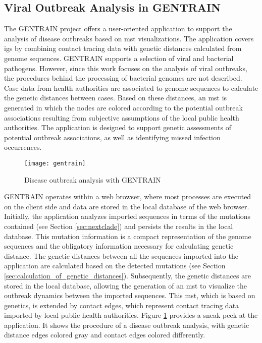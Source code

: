 \subsection{Viral Outbreak Analysis in GENTRAIN}
The GENTRAIN project offers a user-oriented application to support the analysis of disease outbreaks based on \acrshort{mst} visualizations. The application covers \acrshort{igs} by combining contact tracing data with genetic distances calculated from genome sequences. GENTRAIN supports a selection of viral and bacterial pathogens. However, since this work focuses on the analysis of viral outbreaks, the procedures behind the processing of bacterial genomes are not described.
Case data from health authorities are associated to genome sequences to calculate the genetic distances between cases. Based on these distances, an \acrshort{mst} is generated in which the nodes are colored according to the potential outbreak associations resulting from subjective assumptions of the local public health authorities.
The application is designed to support genetic assessments of potential outbreak associations, as well as identifying missed infection occurrences.

\begin{figure}[ht!]
    \texttt{[image: gentrain]}
    \centering
    \caption[Disease outbreak analysis with GENTRAIN]{Disease outbreak analysis with GENTRAIN}
    \label{fig:gentrain}
\end{figure}

GENTRAIN operates within a web browser, where most processes are executed on the client side and data are stored in the local database of the web browser. Initially, the application analyzes imported sequences in terms of the mutations contained (see Section \ref{sec:nextclade}) and persists the results in the local database. This mutation information is a compact representation of the genome sequences and the obligatory information necessary for calculating genetic distance.
The genetic distances between all the sequences imported into the application are calculated based on the detected mutations (see Section \ref{sec:calculation_of_genetic_distances}). Subsequently, the genetic distances are stored in the local database, allowing the generation of an \acrshort{mst} to visualize the outbreak dynamics between the imported sequences. This \acrshort{mst}, which is based on genetics, is extended by contact edges, which represent contact tracing data imported by local public health authorities.
Figure \ref{fig:gentrain} provides a sneak peek at the application. It shows the procedure of a disease outbreak analysis, with genetic distance edges colored gray and contact edges colored differently.

